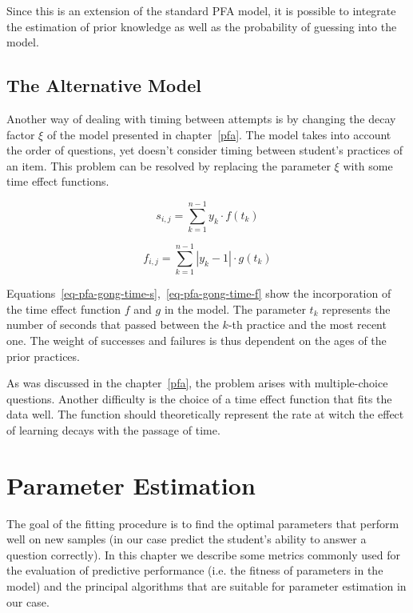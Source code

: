 Since this is an extension of the standard PFA model, it is possible to integrate the estimation of prior knowledge as well as the probability of guessing into the model.

\subsection{The Alternative Model}
\label{pfagt}

Another way of dealing with timing between attempts is by changing the decay factor $\xi$ of the model presented in chapter~\ref{pfa}. The model takes into account the order of questions, yet doesn't consider timing between student's practices of an item. This problem can be resolved by replacing the parameter $\xi$ with some time effect functions.

\begin{equation} \label{eq-pfa-gong-time-s}
  s_{i,j} = \sum_{k=1}^{n-1} y_k \cdot f(t_k)
\end{equation}

\begin{equation} \label{eq-pfa-gong-time-f}
  f_{i,j} = \sum_{k=1}^{n-1} |y_k - 1| \cdot g(t_k)
\end{equation}

Equations~\ref{eq-pfa-gong-time-s},~\ref{eq-pfa-gong-time-f} show the incorporation of the time effect function $f$ and $g$ in the model. The parameter $t_k$ represents the number of seconds that passed between the $k$-th practice and the most recent one. The weight of successes and failures is thus dependent on the ages of the prior practices.

As was discussed in the chapter~\ref{pfa}, the problem arises with multiple-choice questions. Another difficulty is the choice of a time effect function that fits the data well. The function should theoretically represent the rate at witch the effect of learning decays with the passage of time.

\section{Parameter Estimation}

The goal of the fitting procedure is to find the optimal parameters that perform well on new samples (in our case predict the student's ability to answer a question correctly). In this chapter we describe some metrics commonly used for the evaluation of predictive performance (i.e. the fitness of parameters in the model) and the principal algorithms that are suitable for parameter estimation in our case.

